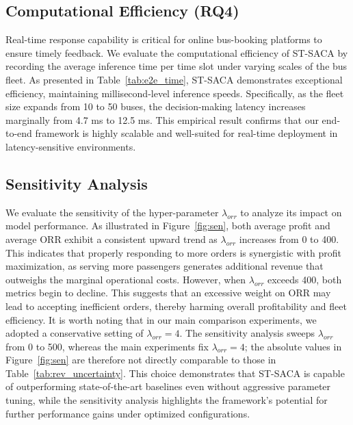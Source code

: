 \documentclass[lettersize,journal]{IEEEtran}
\begin{document}
\subsection{Computational Efficiency (RQ4)}
Real-time response capability is critical for online bus-booking platforms to ensure timely feedback. We evaluate the computational efficiency of ST-SACA by recording the average inference time per time slot under varying scales of the bus fleet. As presented in Table~\ref{tab:e2e_time}, ST-SACA demonstrates exceptional efficiency, maintaining millisecond-level inference speeds. Specifically, as the fleet size expands from 10 to 50 buses, the decision-making latency increases marginally from 4.7 ms to 12.5 ms. This empirical result confirms that our end-to-end framework is highly scalable and well-suited for real-time deployment in latency-sensitive environments.

\begin{table}[htbp]
\caption{\textcolor{blue}{Inference Time per Time Slot (ms) with Varying Fleet Size}}
\label{tab:e2e_time}
\begin{center}
\color{blue}
\end{center}
\end{table}

\subsection{Sensitivity Analysis}
We evaluate the sensitivity of the hyper-parameter $\lambda_{orr}$ to analyze its impact on model performance. As illustrated in Figure~\ref{fig:sen}, both average profit and average ORR exhibit a consistent upward trend as $\lambda_{orr}$ increases from 0 to 400. This indicates that properly responding to more orders is synergistic with profit maximization, as serving more passengers generates additional revenue that outweighs the marginal operational costs. However, when $\lambda_{orr}$ exceeds 400, both metrics begin to decline. This suggests that an excessive weight on ORR may lead to accepting inefficient orders, thereby harming overall profitability and fleet efficiency. It is worth noting that in our main comparison experiments, we adopted a conservative setting of $\lambda_{orr}=4$. The sensitivity analysis sweeps $\lambda_{orr}$ from 0 to 500, whereas the main experiments fix $\lambda_{orr}=4$; the absolute values in Figure~\ref{fig:sen} are therefore not directly comparable to those in Table~\ref{tab:rev_uncertainty}. This choice demonstrates that ST-SACA is capable of outperforming state-of-the-art baselines even without aggressive parameter tuning, while the sensitivity analysis highlights the framework's potential for further performance gains under optimized configurations.
\end{document}
